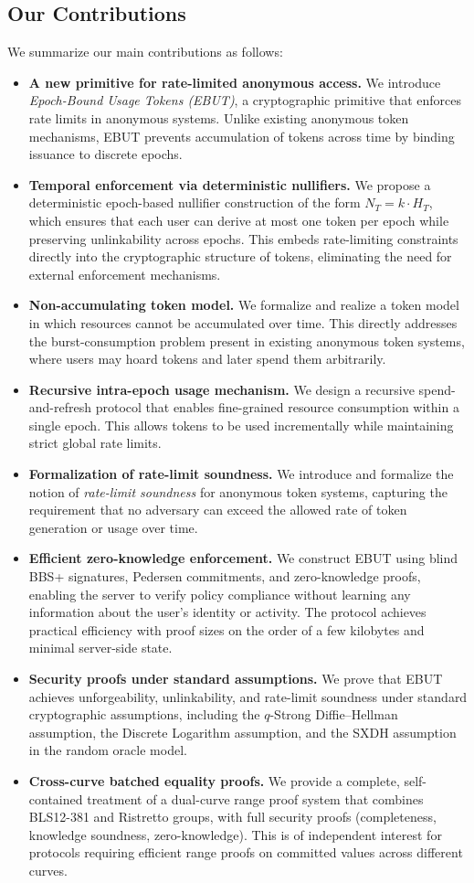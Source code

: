 \documentclass[11pt]{article}
\theoremstyle{definitionstyle}
\theoremstyle{plain}
\begin{document}
\subsection{Our Contributions}
We summarize our main contributions as follows:
\begin{itemize}[leftmargin=*]
\item \textbf{A new primitive for rate-limited anonymous access.} We introduce \emph{Epoch-Bound Usage Tokens (EBUT)}, a cryptographic primitive that enforces rate limits in anonymous systems. Unlike existing anonymous token mechanisms, EBUT prevents accumulation of tokens across time by binding issuance to discrete epochs.
\item \textbf{Temporal enforcement via deterministic nullifiers.} We propose a deterministic epoch-based nullifier construction of the form $N_T = k \cdot H_T$, which ensures that each user can derive at most one token per epoch while preserving unlinkability across epochs. This embeds rate-limiting constraints directly into the cryptographic structure of tokens, eliminating the need for external enforcement mechanisms.
\item \textbf{Non-accumulating token model.} We formalize and realize a token model in which resources cannot be accumulated over time. This directly addresses the burst-consumption problem present in existing anonymous token systems, where users may hoard tokens and later spend them arbitrarily.
\item \textbf{Recursive intra-epoch usage mechanism.} We design a recursive spend-and-refresh protocol that enables fine-grained resource consumption within a single epoch. This allows tokens to be used incrementally while maintaining strict global rate limits.
\item \textbf{Formalization of rate-limit soundness.} We introduce and formalize the notion of \emph{rate-limit soundness} for anonymous token systems, capturing the requirement that no adversary can exceed the allowed rate of token generation or usage over time.
\item \textbf{Efficient zero-knowledge enforcement.} We construct EBUT using blind BBS+ signatures, Pedersen commitments, and zero-knowledge proofs, enabling the server to verify policy compliance without learning any information about the user's identity or activity. The protocol achieves practical efficiency with proof sizes on the order of a few kilobytes and minimal server-side state.
\item \textbf{Security proofs under standard assumptions.} We prove that EBUT achieves unforgeability, unlinkability, and rate-limit soundness under standard cryptographic assumptions, including the $q$-Strong Diffie--Hellman assumption, the Discrete Logarithm assumption, and the SXDH assumption in the random oracle model.
\item \textbf{Cross-curve batched equality proofs.} We provide a complete, self-contained treatment of a dual-curve range proof system that combines BLS12-381 and Ristretto groups, with full security proofs (completeness, knowledge soundness, zero-knowledge). This is of independent interest for protocols requiring efficient range proofs on committed values across different curves.
\end{itemize}
\end{document}
